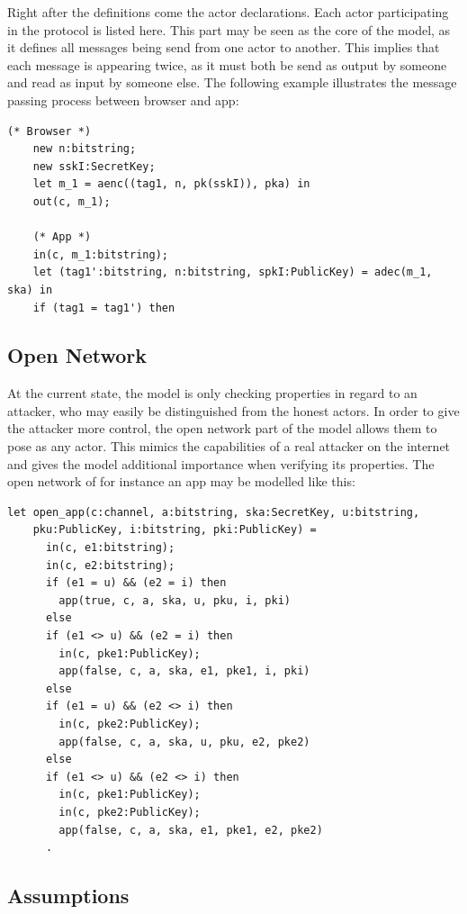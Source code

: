 \documentclass[11pt,twoside,a4paper,openright]{book}
\begin{document}
Right after the definitions come the actor declarations. Each actor participating in the protocol is listed here. This part may be seen as the core of the model, as it defines all messages being send from one actor to another. This implies that each message is appearing twice, as it must both be send as output by someone and read as input by someone else. The following example illustrates the message passing process between browser and app:

\begin{Verbatim}[fontsize=\small]
    (* Browser *)
    new n:bitstring;
    new sskI:SecretKey;
    let m_1 = aenc((tag1, n, pk(sskI)), pka) in
    out(c, m_1);

    (* App *)
    in(c, m_1:bitstring);
    let (tag1':bitstring, n:bitstring, spkI:PublicKey) = adec(m_1, ska) in
    if (tag1 = tag1') then
\end{Verbatim}

\subsection{Open Network}

At the current state, the model is only checking properties in regard to an attacker, who may easily be distinguished from the honest actors. In order to give the attacker more control, the open network part of the model allows them to pose as any actor. This mimics the capabilities of a real attacker on the internet and gives the model additional importance when verifying its properties. The open network of for instance an app may be modelled like this:

\begin{Verbatim}[fontsize=\small]
    let open_app(c:channel, a:bitstring, ska:SecretKey, u:bitstring, 
    pku:PublicKey, i:bitstring, pki:PublicKey) =
      in(c, e1:bitstring);
      in(c, e2:bitstring);
      if (e1 = u) && (e2 = i) then
        app(true, c, a, ska, u, pku, i, pki)
      else
      if (e1 <> u) && (e2 = i) then
        in(c, pke1:PublicKey);
        app(false, c, a, ska, e1, pke1, i, pki)
      else
      if (e1 = u) && (e2 <> i) then
        in(c, pke2:PublicKey);
        app(false, c, a, ska, u, pku, e2, pke2)
      else
      if (e1 <> u) && (e2 <> i) then
        in(c, pke1:PublicKey);
        in(c, pke2:PublicKey);
        app(false, c, a, ska, e1, pke1, e2, pke2)
      .
\end{Verbatim}

\subsection{Assumptions}
\end{document}
